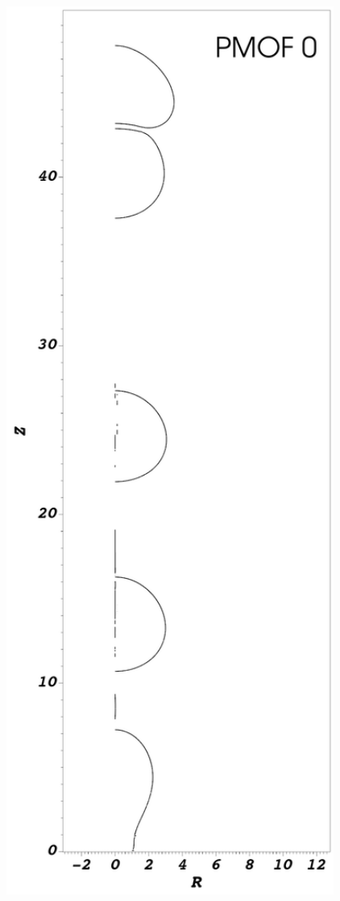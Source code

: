 \documentclass[preprint,12pt]{Definitions/elsarticle}
\begin{document}
\begin{figure}[H]
	\centering
	\begin{minipage}[b]{.32\linewidth}
		\centering
		\includegraphics[width=1\textwidth]{PMOFbubbleformation/PMOF_0_bubbleformation.png} 

\end{minipage}
\end{figure}
\end{document}
